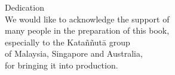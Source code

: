 
\begin{quotepage}{80mm}
\centering\small
{\large\shakerLight Dedication}\\[0.4\baselineskip]
We would like to acknowledge the support of\\
many people in the preparation of this book,\\
especially to the Kataññutā group\\
of Malaysia, Singapore and Australia,\\
for bringing it into production.

\end{quotepage}

